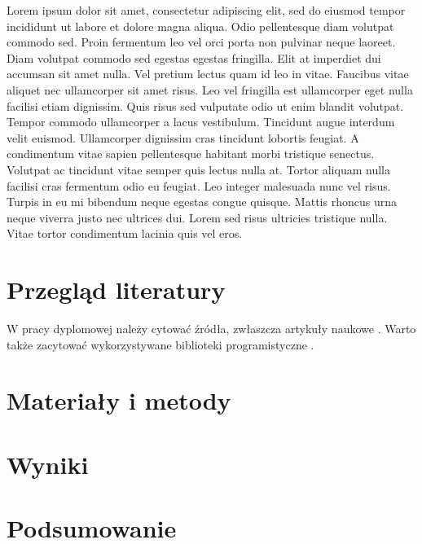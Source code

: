 \documentclass[a4paper,12pt,titlepage]{report}
\begin{document}
Lorem ipsum dolor sit amet, consectetur adipiscing elit, sed do eiusmod tempor incididunt ut labore et dolore magna aliqua. Odio pellentesque diam volutpat commodo sed. Proin fermentum leo vel orci porta non pulvinar neque laoreet. Diam volutpat commodo sed egestas egestas fringilla. Elit at imperdiet dui accumsan sit amet nulla. Vel pretium lectus quam id leo in vitae. Faucibus vitae aliquet nec ullamcorper sit amet risus. Leo vel fringilla est ullamcorper eget nulla facilisi etiam dignissim. Quis risus sed vulputate odio ut enim blandit volutpat. Tempor commodo ullamcorper a lacus vestibulum. Tincidunt augue interdum velit euismod. Ullamcorper dignissim cras tincidunt lobortis feugiat. A condimentum vitae sapien pellentesque habitant morbi tristique senectus. Volutpat ac tincidunt vitae semper quis lectus nulla at. Tortor aliquam nulla facilisi cras fermentum odio eu feugiat. Leo integer malesuada nunc vel risus. Turpis in eu mi bibendum neque egestas congue quisque. Mattis rhoncus urna neque viverra justo nec ultrices dui. Lorem sed risus ultricies tristique nulla. Vitae tortor condimentum lacinia quis vel eros.

\newpage

\chapter{Przegląd literatury}
W pracy dyplomowej należy cytować źródła, zwłaszcza artykuły naukowe \cite{vaswani2017, dosovitskiy2020}.
Warto także zacytować wykorzystywane biblioteki programistyczne \cite{paszke}.

\newpage

\chapter{Materiały i metody}
\newpage

\chapter{Wyniki}
\newpage

\chapter{Podsumowanie}
\newpage

\end{document}
